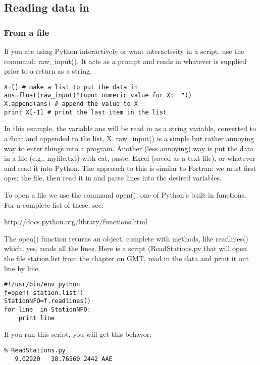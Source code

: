 {\subsection{Reading data in}
\subsubsection{From a file}

If you are using Python interactively or want interactivity in a script,  use the command:  {\color{blue}raw\_input()}.  It acts as a prompt and reads in whatever is supplied prior to a return as a string.  

{\singlespacing \color{blue} \begin{verbatim}
X=[] # make a list to put the data in
ans=float(raw_input("Input numeric value for X:  ")) 
X.append(ans) # append the value to X
print X[-1] # print the last item in the list
\end{verbatim}}
\noindent
In this example, the variable {\color{blue}ans} will be read in as a string variable,  converted to a float and appended to the list, {\color{blue}X}.    {\color{blue}raw\_input()} is a simple but rather annoying way to enter things into a program.  
Another (less annoying)  way is  put the data in a file (e.g., myfile.txt) with cat, paste, Excel (saved as a text file), or whatever and read  it into Python.  The approach to this is similar to Fortran:  we must first open the file, then read it in and parse lines into the desired variables.  

To open a file we use the command {\color{blue}open()}, one of Python's built-in functions.  For a complete list of these, see:

http://docs.python.org/library/functions.html

\noindent  The  {\color{blue}open()} function returns an object,  complete with methods, like {\color{blue}readlines()} which, yes, reads all the lines.  
Here is a script ({\color{blue}ReadStations.py} that will open the file  {\color{blue}station.list} from the chapter on GMT, read in the data and print it out line by line.  
{\singlespacing \color{blue} \begin{verbatim}
#!/usr/bin/env python
f=open('station.list')
StationNFO=f.readlines()
for line  in StationNFO:
    print line
\end{verbatim}}

If you run this script, you will get this behavor:
{\singlespacing \color{blue} \begin{verbatim}
% ReadStations.py
   9.02920   38.76560 2442 AAE 


\end{verbatim}}}
